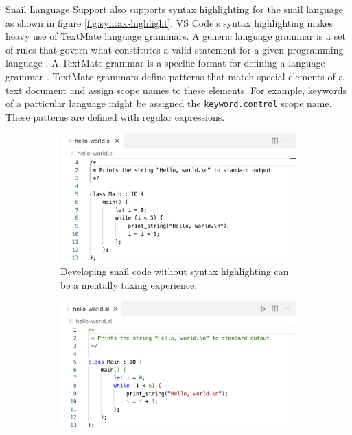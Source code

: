 \documentclass{article}
\begin{document}
Snail Language Support also supports syntax highlighting for the snail language as shown in figure \ref{fig:syntax-highlight}. VS Code's syntax highlighting makes heavy use of TextMate language grammars. A generic language grammar is a set of rules that govern what constitutes a valid statement for a given programming language \cite{pgrandinetti_2019}. A TextMate grammar is a specific format for defining a language grammar \cite{MacroMates_2021a}. TextMate grammars define patterns that match special elements of a text document and assign scope names to these elements. For example, keywords of a particular language might be assigned the \lstinline{keyword.control} scope name. These patterns are defined with regular expressions. 

\begin{figure}[b]
    \begin{subfigure}[c][][c]{0.45\textwidth}
        \begin{center}
            \includegraphics[width=\textwidth]{dev-no-highlight-light.png}
            \caption{Developing snail code without syntax highlighting can be a mentally taxing experience.}
            \label{fig:dev-no-highlight}
        \end{center}
    \end{subfigure}
    \hspace{0.05\textwidth}
    \begin{subfigure}[c][][c]{0.45\textwidth}
        \begin{center}
            \includegraphics[width=\textwidth]{dev-with-highlight-light.png}

\end{center}
\end{subfigure}
\end{figure}
\end{document}
